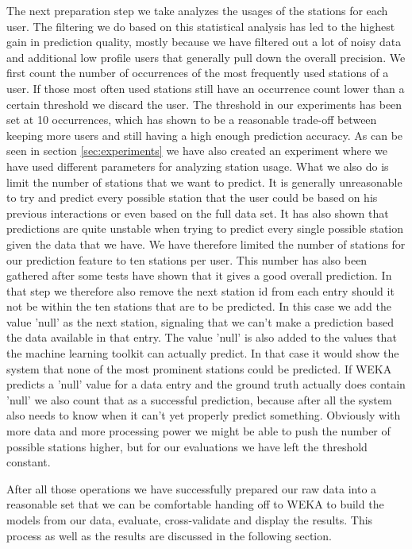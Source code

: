\label{subsec:station_usage}
The next preparation step we take analyzes the usages of the stations for each user. The filtering we do based on this statistical analysis has led to the highest gain in prediction quality, mostly because we have filtered out a lot of noisy data and additional low profile users that generally pull down the overall precision. We first count the number of occurrences of the most frequently used stations of a user. If those most often used stations still have an occurrence count lower than a certain threshold we discard the user. The threshold in our experiments has been set at 10 occurrences, which has shown to be a reasonable trade-off between keeping more users and still having a high enough prediction accuracy. As can be seen in section \ref{sec:experiments} we have also created an experiment where we have used different parameters for analyzing station usage. 
What we also do is limit the number of stations that we want to predict. It is generally unreasonable to try and predict every possible station that the user could be based on his previous interactions or even based on the full data set. It has also shown that predictions are quite unstable when trying to predict every single possible station given the data that we have. We have therefore limited the number of stations for our prediction feature to ten stations per user. This number has also been gathered after some tests have shown that it gives a good overall prediction. In that step we therefore also remove the next station id from each entry should it not be within the ten stations that are to be predicted. In this case we add the value 'null' as the next station, signaling that we can't make a prediction based the data available in that entry. The value 'null' is also added to the values that the machine learning toolkit can actually predict. In that case it would show the system that none of the most prominent stations could be predicted. If WEKA predicts a 'null' value for a data entry and the ground truth actually does contain 'null' we also count that as a successful prediction, because after all the system also needs to know when it can't yet properly predict something. Obviously with more data and more processing power we might be able to push the number of possible stations higher, but for our evaluations we have left the threshold constant.

After all those operations we have successfully prepared our raw data into a reasonable set that we can be comfortable handing off to WEKA to build the models from our data, evaluate, cross-validate and display the results. This process as well as the results are discussed in the following section.

